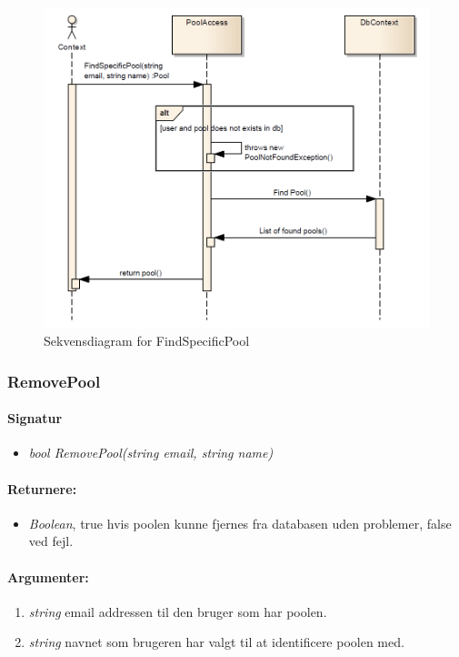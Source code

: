 \begin{figure}
\centering
\includegraphics[width=0.7\linewidth]{figs/dbSeq/findSpecificPool}
\caption{Sekvensdiagram for FindSpecificPool}
\label{fig:findSpecificPool}
\end{figure}




\subsubsection{RemovePool}%

\paragraph{Signatur}
\begin{itemize}
	\item \textit{bool RemovePool(string email, string name)}
\end{itemize}

\paragraph{Returnere:}
\begin{itemize}
	\item \textit{Boolean}, true hvis poolen kunne fjernes fra databasen uden problemer, false ved fejl.
\end{itemize}

\paragraph{Argumenter:}
\begin{enumerate}
	\item \textit{string} email addressen til den bruger som har poolen.
	\item \textit{string} navnet som brugeren har valgt til at identificere poolen med.
\end{enumerate}


